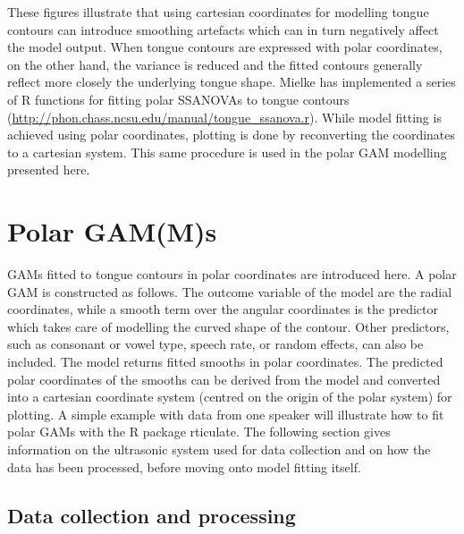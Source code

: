 \documentclass[11pt,]{article}
\begin{document}
These figures illustrate that using cartesian coordinates for modelling
tongue contours can introduce smoothing artefacts which can in turn
negatively affect the model output. When tongue contours are expressed
with polar coordinates, on the other hand, the variance is reduced and
the fitted contours generally reflect more closely the underlying tongue
shape. Mielke has implemented a series of R \citep{r-core-team2018}
functions for fitting polar SSANOVAs to tongue contours
(\url{http://phon.chass.ncsu.edu/manual/tongue_ssanova.r}). While model
fitting is achieved using polar coordinates, plotting is done by
reconverting the coordinates to a cartesian system. This same procedure
is used in the polar GAM modelling presented here.

\hypertarget{polar-gamms}{%
\section{Polar GAM(M)s}\label{polar-gamms}}

GAMs fitted to tongue contours in polar coordinates are introduced here.
A polar GAM is constructed as follows. The outcome variable of the model
are the radial coordinates, while a smooth term over the angular
coordinates is the predictor which takes care of modelling the curved
shape of the contour. Other predictors, such as consonant or vowel type,
speech rate, or random effects, can also be included. The model returns
fitted smooths in polar coordinates. The predicted polar coordinates of
the smooths can be derived from the model and converted into a cartesian
coordinate system (centred on the origin of the polar system) for
plotting. A simple example with data from one speaker will illustrate
how to fit polar GAMs with the R package rticulate. The following
section gives information on the ultrasonic system used for data
collection and on how the data has been processed, before moving onto
model fitting itself.

\hypertarget{data-collection-and-processing}{%
\subsection{Data collection and
processing}\label{data-collection-and-processing}}

\label{s:data}
\end{document}
